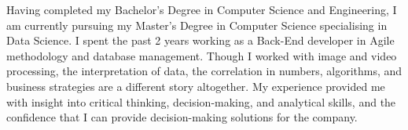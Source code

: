 Having completed my Bachelor’s Degree in Computer Science and Engineering, I am currently pursuing my Master’s Degree in Computer Science specialising in Data Science. I spent the past 2 years working as a Back-End developer in Agile methodology and database management.
{Though I worked with image and video processing, the interpretation of data, the correlation in numbers, algorithms, and business strategies are a different story altogether.}
My experience provided me with insight into critical thinking, decision-making, and analytical skills, and the confidence that I can provide decision-making solutions for the company.